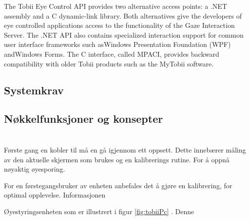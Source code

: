 \documentclass[phd,tocprelim]{cornell}
\begin{document}
The Tobii Eye Control API provides two alternative access points: a .NET assembly and a C dynamic-link library. Both alternatives
give the developers of eye controlled applications access to the functionality of the Gaze Interaction Server. The .NET API also
contains specialized interaction support for common user interface frameworks such asWindows Presentation Foundation
(WPF) andWindows Forms. The C interface, called MPACI, provides backward compatibility with older Tobii products such as
the MyTobii software.




\subsection{Systemkrav}

\subsection{Nøkkelfunksjoner og konsepter}

\section{}

Første gang en kobler til må en gå igjennom ett oppsett. Dette innebærer måling av den aktuelle skjermen som brukes og en kalibrerings rutine. For å oppnå nøyaktig øyesporing.  

For en førstegangsbruker av enheten anbefales det å gjøre en kalibrering, for optimal opplevelse. Informasjonen


Øyestyringsenheten som er illustrert i figur \ref{fig:tobiiPc}  . Denne




\medskip


\end{document}
